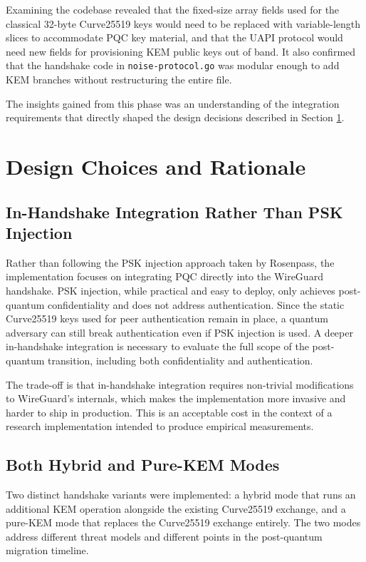 Examining the codebase revealed that the fixed-size array fields used for the classical 32-byte Curve25519 keys would need to be replaced with variable-length slices to accommodate PQC key material, and that the UAPI protocol would need new fields for provisioning KEM public keys out of band. It also confirmed that the handshake code in \texttt{noise-protocol.go} was modular enough to add KEM branches without restructuring the entire file. 

The insights gained from this phase was an understanding of the integration requirements that directly shaped the design decisions described in Section \ref{sec:design}.


\section{Design Choices and Rationale}\label{sec:design}
\subsection{In-Handshake Integration Rather Than PSK Injection} 
Rather than following the PSK injection approach taken by Rosenpass, the implementation focuses on integrating PQC directly into the WireGuard handshake. PSK injection, while practical and easy to deploy, only achieves post-quantum confidentiality and does not address authentication. Since the static Curve25519 keys used for peer authentication remain in place, a quantum adversary can still break authentication even if PSK injection is used. A deeper in-handshake integration is necessary to evaluate the full scope of the post-quantum transition, including both confidentiality and authentication. 

The trade-off is that in-handshake integration requires non-trivial modifications to WireGuard's internals, which makes the implementation more invasive and harder to ship in production. This is an acceptable cost in the context of a research implementation intended to produce empirical measurements. 

\subsection{Both Hybrid and Pure-KEM Modes} 
Two distinct handshake variants were implemented: a hybrid mode that runs an additional KEM operation alongside the existing Curve25519 exchange, and a pure-KEM mode that replaces the Curve25519 exchange entirely. The two modes address different threat models and different points in the post-quantum migration timeline.

